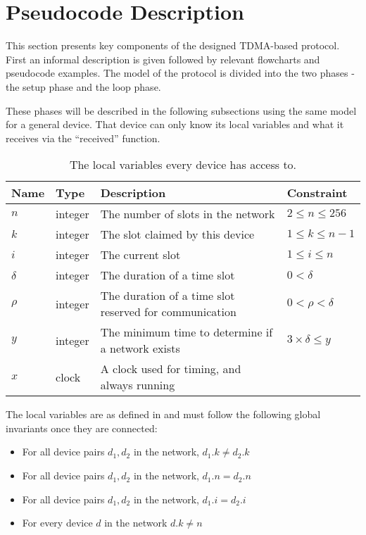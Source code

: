 \section{Pseudocode Description}
This section presents key components of the designed TDMA-based protocol. 
First an informal description is given followed by relevant flowcharts and pseudocode examples. 
The model of the protocol is divided into the two phases - the setup phase and the loop phase. 

These phases will be described in the following subsections using the same model for a general device. 
That device can only know its local variables and what it receives via the \enquote{received} function.

\begin{table}[H]
	\begin{tabularx}{\textwidth}{l|l|X|l}
		\toprule
		Name		& Type		& Description & Constraint \\
		\midrule
		$n$			& integer	& The number of slots in the network 						& $2 \leq n \leq 256$\\
		$k$			& integer	& The slot claimed by this device 							& $1 \leq k \leq n - 1$\\
		$i$			& integer	& The current slot 											& $1 \leq i \leq n$\\
		$\delta$ 	& integer	& The duration of a time slot 								& $0 < \delta$\\
		$\rho$		& integer	& The duration of a time slot reserved for communication 	& $0 < \rho < \delta$ \\
		$y$			& integer	& The minimum time to determine if a network exists			& $3 \times \delta \leq y$ \\
		$x$			& clock		& A clock used for timing, and always running\\
		\bottomrule
	\end{tabularx}
	\caption{The local variables every device has access to.}
	\label{tab:locals}
\end{table}

The local variables are as defined in  and must follow the following global invariants once they are connected:
\begin{itemize}
\item For all device pairs ${d_1, d_2}$ in the network, $d_1.k \neq d_2.k$
\item For all device pairs ${d_1, d_2}$ in the network, $d_1.n = d_2.n$
\item For all device pairs ${d_1, d_2}$ in the network, $d_1.i = d_2.i$
\item For every device $d$ in the network $d.k \neq n$
\end{itemize}

